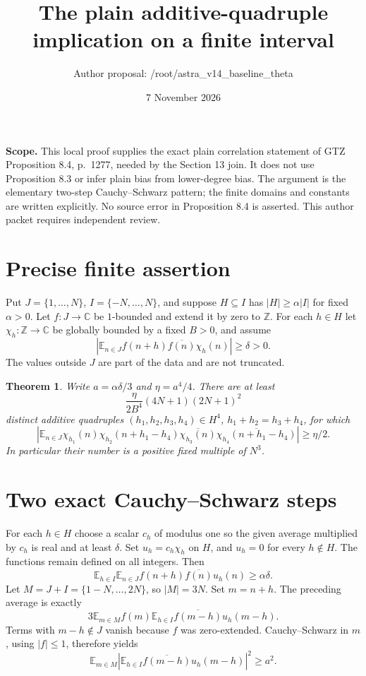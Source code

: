 \documentclass[11pt]{article}
\title{The plain additive-quadruple implication on a finite interval}
\author{Author proposal: /root/astra\_v14\_baseline\_theta}
\date{7 November 2026}
\newtheorem{theorem}{Theorem}
\newcommand{\Z}{\mathbb Z}\newcommand{\C}{\mathbb C}
\newcommand{\E}{\mathbb E}
\begin{document}
\maketitle

\noindent\textbf{Scope.} This local proof supplies the exact plain
correlation statement of GTZ Proposition 8.4, p.~1277, needed by the
Section 13 join. It does not use Proposition 8.3 or infer plain bias
from lower-degree bias. The argument is the elementary two-step
Cauchy--Schwarz pattern; the finite domains and constants are written
explicitly. No source error in Proposition 8.4 is asserted. This
author packet requires independent review.

\section{Precise finite assertion}
Put $J=\{1,\ldots,N\}$, $I=\{-N,\ldots,N\}$, and suppose
$H\subseteq I$ has $|H|\geq\alpha |I|$ for fixed $\alpha>0$.
Let $f:J\to\C$ be $1$-bounded and extend it by zero to $\Z$.
For each $h\in H$ let $\chi_h:\Z\to\C$ be globally bounded
by a fixed $B>0$, and assume
\[
 \left|\E_{n\in J} f(n+h)\overline{f(n)}\chi_h(n)\right|
 \geq\delta>0.
\]
The values outside $J$ are part of the data and are not truncated.

\begin{theorem}\label{thm:plain}
Write $a=\alpha\delta/3$ and $\eta=a^4/4$.
There are at least
\[
 \frac{\eta}{2B^4}(4N+1)(2N+1)^2
\]
distinct additive quadruples $(h_1,h_2,h_3,h_4)\in H^4$,
$h_1+h_2=h_3+h_4$, for which
\[
 \left|\E_{n\in J}
  \chi_{h_1}(n)\chi_{h_2}(n+h_1-h_4)
  \overline{\chi_{h_3}(n)}
  \overline{\chi_{h_4}(n+h_1-h_4)}\right|
 \geq\eta/2.
\]
In particular their number is a positive fixed multiple of $N^3$.
\end{theorem}

\section{Two exact Cauchy--Schwarz steps}
For each $h\in H$ choose a scalar $c_h$ of modulus one so the
given average multiplied by $c_h$ is real and at least $\delta$.
Set $u_h=c_h\chi_h$ on $H$, and $u_h=0$ for every $h\notin H$.
The functions remain defined on all integers. Then
\[
 \E_{h\in I}\E_{n\in J}
 f(n+h)\overline{f(n)}u_h(n)\geq\alpha\delta.
\]
Let $M=J+I=\{1-N,\ldots,2N\}$, so $|M|=3N$.
Set $m=n+h$. The preceding average is exactly
\[
 3\E_{m\in M}f(m)
       \E_{h\in I}\overline{f(m-h)}u_h(m-h).
\]
Terms with $m-h\notin J$ vanish because $f$ was zero-extended.
Cauchy--Schwarz in $m$, using $|f|\leq1$, therefore yields
\begin{equation}\label{eq:first}
 \E_{m\in M}\left|\E_{h\in I}
          \overline{f(m-h)}u_h(m-h)\right|^2\geq a^2.
\end{equation}
\end{document}
